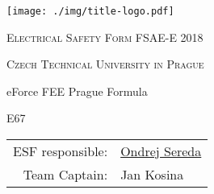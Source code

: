 	\centering	
\texttt{[image: ./img/title-logo.pdf]}
\vspace{.5cm}
{\scshape\huge Electrical Safety Form FSAE-E 2018 \par}
\vspace{.5cm}
{\scshape\Large Czech Technical University in Prague\par}
\vspace{.5cm}
{\LARGE eForce FEE Prague Formula\par}
\vspace{.9cm}
{\LARGE E67\par}
\vspace{.6cm}

\begin{table}[H]
	\centering
	\begin{tabular}{rl}
		ESF responsible: &  \href{mailto:ondrej.sereda@eforce.cvut.cz}{Ondrej Sereda}  \\
		Team Captain: & Jan Kosina   \\
	\end{tabular}%
	\label{tab:title}%
\end{table}%



\vfill